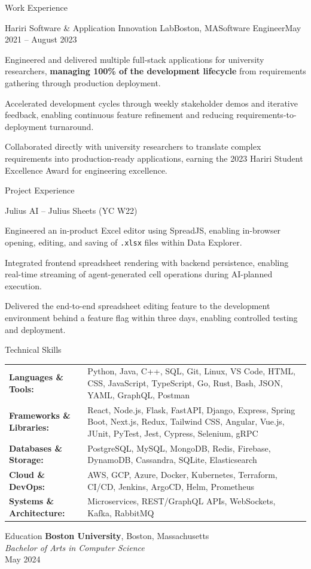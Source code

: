 \documentclass{resume}
\begin{document}
\begin{rSection}{Work Experience}
  \begin{rSubsection}{Hariri Software \& Application Innovation Lab}{Boston, MA}{Software Engineer}{May 2021 -- August 2023}
    \item Engineered and delivered multiple full-stack applications for university researchers, \textbf{managing 100\% of the development lifecycle} from requirements gathering through production deployment.
    \item Accelerated development cycles through weekly stakeholder demos and iterative feedback, enabling continuous feature refinement and reducing requirements-to-deployment turnaround.
    \item Collaborated directly with university researchers to translate complex requirements into production-ready applications, earning the 2023 Hariri Student Excellence Award for engineering excellence.
  \end{rSubsection}
\end{rSection}

\begin{rSection}{Project Experience}
  \begin{rSubsection}{Julius AI -- Julius Sheets (YC W22)}{}{}{}
    \item Engineered an in-product Excel editor using SpreadJS, enabling in-browser opening, editing, and saving of \texttt{.xlsx} files within Data Explorer.
    \item Integrated frontend spreadsheet rendering with backend persistence, enabling real-time streaming of agent-generated cell operations during AI-planned execution.
    \item Delivered the end-to-end spreadsheet editing feature to the development environment behind a feature flag within three days, enabling controlled testing and deployment.
  \end{rSubsection}
\end{rSection}

\begin{rSection}{Technical Skills}
  \begin{tabular}{@{} l p{13cm}}
    \textbf{Languages \& Tools:}      & Python, Java, C++, SQL, Git, Linux, VS Code, HTML, CSS, JavaScript, TypeScript, Go, Rust, Bash, JSON, YAML, GraphQL, Postman \\
    \textbf{Frameworks \& Libraries:} & React, Node.js, Flask, FastAPI, Django, Express, Spring Boot, Next.js, Redux, Tailwind CSS, Angular, Vue.js, JUnit, PyTest, Jest, Cypress, Selenium, gRPC \\
    \textbf{Databases \& Storage:}    & PostgreSQL, MySQL, MongoDB, Redis, Firebase, DynamoDB, Cassandra, SQLite, Elasticsearch \\
    \textbf{Cloud \& DevOps:}         & AWS, GCP, Azure, Docker, Kubernetes, Terraform, CI/CD, Jenkins, ArgoCD, Helm, Prometheus \\
    \textbf{Systems \& Architecture:} & Microservices, REST/GraphQL APIs, WebSockets, Kafka, RabbitMQ \\
  \end{tabular}
\end{rSection}

\begin{rSection}{Education}
  {\bf Boston University}, Boston, Massachusetts \\
  {\em Bachelor of Arts in Computer Science} \\
  May 2024
\end{rSection}
\end{document}
